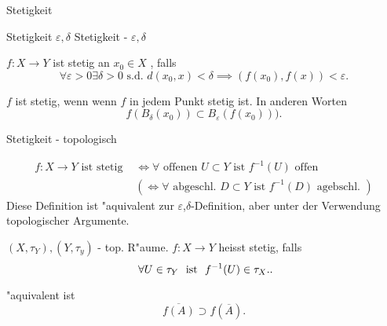 \documentclass[class=article, crop=false]{standalone}
\begin{document}
\begin{zettel}{Stetigkeit}
\begin{flashcard}[z7o3jrfv]{Stetigkeit $\varepsilon, \delta$ }
	Stetigkeit - $\varepsilon, \delta $

	\begin{definition}[Stetigkeit]
		$f:X \longrightarrow Y$ ist stetig an $x_0 \in  X$ , falls
		\[
			\forall \varepsilon >  0 \exists  \delta  > 0 \text{ s.d. }  d (x_0 , x) < \delta \implies (f (x_0), f (x)) <  \varepsilon
		.\]

		$f$ ist stetig, wenn wenn $f$ in jedem Punkt stetig ist.
		In anderen Worten
		\[
			f (B_{\delta }(x_0)) \subset B_{\varepsilon } (f (x_0)) ).
		\]
	\end{definition}
\end{flashcard}

\begin{flashcard}[9wbgtes1]{Stetigkeit - topologisch}
	\begin{definition}[Stetigkeit]
		\begin{align*}
			f:X \longrightarrow Y \text{ ist stetig } & \iff \forall \text{ offenen } U \subset Y \text{ ist } f^{-1} (U) \text{ offen }            \\
			                                          & ( \iff \forall  \text{ abgeschl. } D \subset Y \text{ ist } f^{-1} (D) \text{ agebschl. } )
		\end{align*}
		Diese Definition ist "aquivalent zur $\varepsilon $,$\delta$-Definition, aber unter der Verwendung topologischer Argumente.
	\end{definition}
\end{flashcard}

\begin{definition}[Stetigkeit]
	$(X, \tau_Y), (Y, \tau_y)$  - top. R"aume. $f:X \longrightarrow Y$ heisst stetig, falls
	\[
		\forall U \in  \tau_Y \tx{ ist } f^{-1} (U) \in  \tau_X.
	.\]
\end{definition}

"aquivalent ist
\[
	\overline{f(A)} \supset f (\overline{A})
.\]

\end{zettel}
\end{document}
